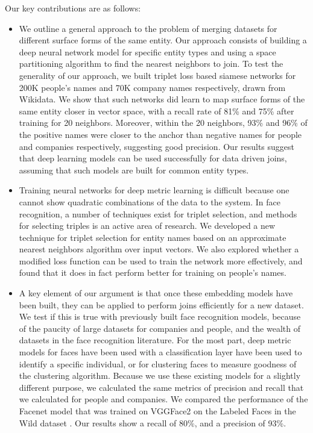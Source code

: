 Our key contributions are as follows:
\begin{itemize}
\item We outline a general approach to the problem of merging datasets for different surface forms of the same entity.  Our approach consists of building a deep neural network model for specific entity types and using a space partitioning algorithm to find the nearest neighbors to join.  To test the generality of our approach, we built triplet loss based siamese networks for 200K people's names and 70K company names respectively, drawn from Wikidata.  We show that such networks did learn to map surface forms of the same entity closer in vector space, with a recall rate of 81\% and 75\% after training for 20 neighbors.  Moreover, within the 20 neighbors, 93\% and 96\% of the positive names were closer to the anchor than negative names for people and companies respectively, suggesting good precision.  Our results suggest that deep learning models can be used successfully for data driven joins, assuming that such models are built for common entity types.
\item Training neural networks for deep metric learning is difficult because one cannot show quadratic combinations of the data to the system.  In face recognition, a number of techniques exist for triplet selection, and methods for selecting triples is an active area of research.  We developed a new technique for triplet selection for entity names based on an approximate nearest neighbors algorithm over input vectors.  We also explored whether a modified loss function can be used to train the network more effectively, and found that it does in fact perform better for training on people's names.
\item A key element of our argument is that once these embedding models have been built, they can be applied to perform joins efficiently for a new dataset.  We test if this is true with previously built face recognition models, because of the paucity of large datasets for companies and people, and the wealth of datasets in the face recognition literature.  For the most part, deep metric models for faces have been used with a classification layer have been used to identify a specific individual, or for clustering faces to measure goodness of the clustering algorithm.  Because we use these existing models for a slightly different purpose, we calculated the same metrics of precision and recall that we calculated for people and companies. We compared the performance of the Facenet model that was trained on VGGFace2 \cite{DBLP:conf/fgr/CaoSXPZ18} on the Labeled Faces in the Wild dataset \cite{Huang_labeledfaces}.  Our results show a recall of 80\%, and a precision of 93\%.  
\end{itemize} 

